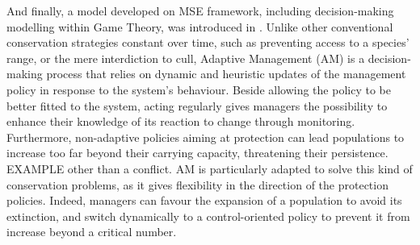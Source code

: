 \documentclass[12pt,a4paper]{article}
\begin{document}
And finally, a model developed on MSE framework, including decision-making modelling within Game Theory, was introduced in \cite{duthie2018}.
Unlike other conventional conservation strategies constant over time, such as preventing access to a species' range, or the mere interdiction to cull,
Adaptive Management (AM) is a decision-making process that relies on dynamic and heuristic updates of the management policy in response to the system's behaviour.
Beside allowing the policy to be better fitted to the system, acting regularly gives managers the possibility to enhance their knowledge of its reaction to change through monitoring. %
%
%
%
Furthermore, non-adaptive policies aiming at protection can lead populations to increase too far beyond their carrying capacity, threatening their persistence.
EXAMPLE other than a conflict.
AM is particularly adapted to solve this kind of conservation problems, as it gives flexibility in the direction of the protection policies.
Indeed, managers can favour the expansion of a population to avoid its extinction, and switch dynamically to a control-oriented policy to prevent it from increase beyond a critical number. 
\end{document}

